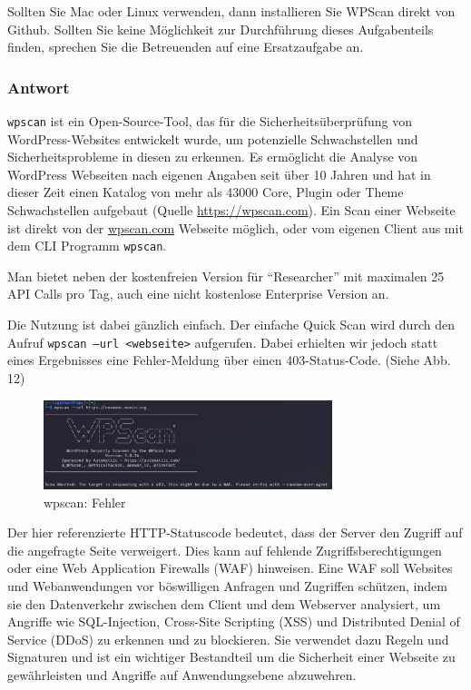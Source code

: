 \documentclass{article}
\begin{document}
Sollten Sie Mac oder Linux verwenden, dann installieren Sie WPScan direkt von Github. 
Sollten Sie keine Möglichkeit zur Durchführung dieses Aufgabenteils finden, sprechen 
Sie die Betreuenden auf eine Ersatzaufgabe an.

\subsubsection*{Antwort}

\texttt{wpscan} ist ein Open-Source-Tool, das für die Sicherheitsüberprüfung von 
WordPress-Websites entwickelt wurde, um potenzielle Schwachstellen und Sicherheitsprobleme in 
diesen zu erkennen. Es ermöglicht die Analyse von WordPress Webseiten nach eigenen Angaben 
seit über 10 Jahren und hat in dieser Zeit einen Katalog von mehr als 43000 Core, Plugin oder 
Theme Schwachstellen aufgebaut (Quelle \url{https://wpscan.com}). Ein Scan einer Webseite ist 
direkt von der \url{wpscan.com} Webseite möglich, oder vom eigenen Client aus mit dem CLI 
Programm \texttt{wpscan}.

Man bietet neben der kostenfreien Version für ``Researcher'' mit maximalen 25 API Calls pro 
Tag, auch eine nicht kostenlose Enterprise Version an.

Die Nutzung ist dabei gänzlich einfach. Der einfache Quick Scan wird durch den Aufruf 
\texttt{wpscan –url <webseite>} aufgerufen. Dabei erhielten wir jedoch statt eines 
Ergebnisses eine Fehler-Meldung über einen 403-Status-Code. (Siehe Abb. 12)

\begin{figure}[H]
	\includegraphics[width=0.75\textwidth]{images/12}
	\centering
	\caption{wpscan: Fehler}
\end{figure}

Der hier referenzierte HTTP-Statuscode bedeutet, dass der Server den Zugriff auf die 
angefragte Seite verweigert. Dies kann auf fehlende Zugriffsberechtigungen oder eine Web 
Application Firewalls (WAF) hinweisen. Eine WAF soll Websites und Webanwendungen vor 
böswilligen Anfragen und Zugriffen schützen, indem sie den Datenverkehr zwischen dem Client 
und dem Webserver analysiert, um Angriffe wie SQL-Injection, Cross-Site Scripting (XSS) und 
Distributed Denial of Service (DDoS) zu erkennen und zu blockieren. Sie verwendet dazu Regeln 
und Signaturen und ist ein wichtiger Bestandteil um die Sicherheit einer Webseite zu 
gewährleisten und Angriffe auf Anwendungsebene abzuwehren.
\end{document}
